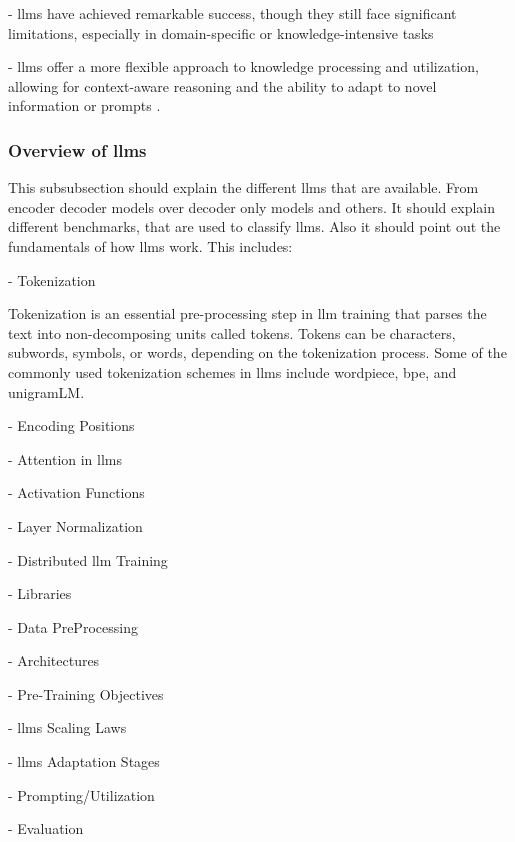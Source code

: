 - \glspl{llm} have achieved remarkable success, though they still face significant limitations, especially in domain-specific or knowledge-intensive tasks\cite{gaoRetrievalAugmentedGenerationLarge2024}

- \glspl{llm} offer a more flexible approach to knowledge processing and utilization, allowing for context-aware reasoning and the ability to adapt to novel information or prompts \cite{huangReasoningLargeLanguage2023}.

\subsubsection{Overview of \glspl{llm}}
This subsubsection should explain the different \glspl{llm} that are available. From encoder decoder models over decoder only models and others. It should explain different benchmarks, that are used to classify \glspl{llm}.
Also it should point out the fundamentals of how \glspl{llm} work. This includes:

- Tokenization

Tokenization is an essential pre-processing step in \gls{llm} training that parses the text into non-decomposing units called tokens. Tokens can be characters, subwords, symbols, or words, depending on the tokenization process. Some of the commonly used tokenization schemes in \glspl{llm} include wordpiece, \gls{bpe}, and unigramLM.\cite{mielkeWordsCharactersBrief2021}


- Encoding Positions


- Attention in \glspl{llm} \cite{vaswaniAttentionAllYou2023}


- Activation Functions


- Layer Normalization


- Distributed \gls{llm} Training


- Libraries


- Data PreProcessing


- Architectures


- Pre-Training Objectives


- \glspl{llm} Scaling Laws


- \glspl{llm} Adaptation Stages


- Prompting/Utilization


- Evaluation


